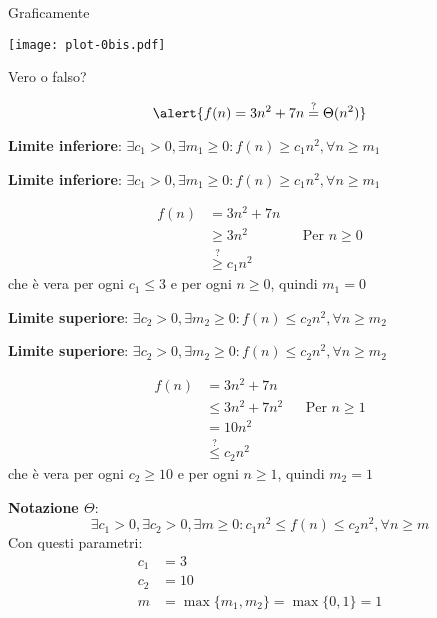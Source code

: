 \begin{frame}{Graficamente}

\begin{center}
\vspace{-12pt}
\texttt{[image: plot-0bis.pdf]}
\end{center}

\end{frame}


\begin{frame}{Vero o falso?}

\begin{exampleblock}{}
\[ 
  \alert{f(n) = 3 n^2 + 7n \stackrel{?}{=} \Theta(n^2)}  
\]
\end{exampleblock}

\begin{overprint}

\textbf{Limite inferiore}: $\exists c_1>0, \exists m_1 \geq 0: f(n) \geq c_1n^2, \forall n \geq m_1$

\textbf{Limite inferiore}: $\exists c_1>0, \exists m_1 \geq 0: f(n) \geq c_1n^2, \forall n \geq m_1$

\begin{align*}
f(n) &= 3n^2 + 7n \\
     &\geq 3n^2 && \text{Per $n \geq 0$} \\
     &\stackrel{?}{\geq} c_1n^2
\end{align*}
che è vera per ogni $c_1 \leq 3$ e per ogni $n \geq 0$, quindi $m_1=0$

\textbf{Limite superiore}: $\exists c_2>0, \exists m_2 \geq 0: f(n) \leq c_2n^2, \forall n \geq m_2$

\textbf{Limite superiore}: $\exists c_2>0, \exists m_2 \geq 0: f(n) \leq c_2n^2, \forall n \geq m_2$

\begin{align*}
f(n) &=    3n^2 + 7n \\
     &\leq 3n^2 + 7n^2 && \text{Per $n \geq 1$}\\
     &=    10n^2 \\
     &\stackrel{?}{\leq} c_2n^2
\end{align*}
che è vera per ogni $c_2 \geq 10$ e per ogni $n \geq 1$, quindi $m_2=1$

\textbf{Notazione $\Theta$}: \[
\exists c_1>0, \exists c_2>0, \exists m \geq 0:  c_1 n^2 \leq f(n) \leq c_2n^2, \forall n \geq m
\]
Con questi parametri:
\begin{align*}
c_1 &= 3 \\
c_2 &= 10 \\
m &= \max \{ m_1, m_2 \} = \max \{ 0, 1 \} = 1
\end{align*}

\end{overprint}

\end{frame}

